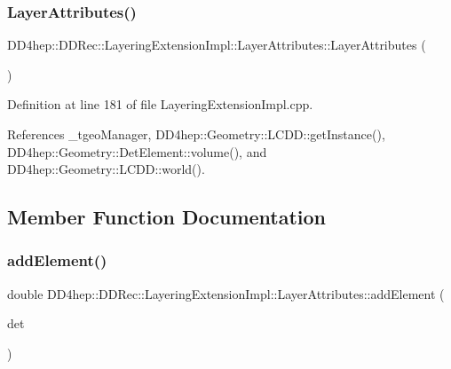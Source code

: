 \subsubsection{\texorpdfstring{Layer\+Attributes()}{LayerAttributes()}}
{\footnotesize\ttfamily D\+D4hep\+::\+D\+D\+Rec\+::\+Layering\+Extension\+Impl\+::\+Layer\+Attributes\+::\+Layer\+Attributes (\begin{DoxyParamCaption}{ }\end{DoxyParamCaption})}



Definition at line 181 of file Layering\+Extension\+Impl.\+cpp.



References \+\_\+tgeo\+Manager, D\+D4hep\+::\+Geometry\+::\+L\+C\+D\+D\+::get\+Instance(), D\+D4hep\+::\+Geometry\+::\+Det\+Element\+::volume(), and D\+D4hep\+::\+Geometry\+::\+L\+C\+D\+D\+::world().



\subsection{Member Function Documentation}
\hypertarget{struct_d_d4hep_1_1_d_d_rec_1_1_layering_extension_impl_1_1_layer_attributes_a39fc239560d87538d35e8e5051b9b0aa}{}\label{struct_d_d4hep_1_1_d_d_rec_1_1_layering_extension_impl_1_1_layer_attributes_a39fc239560d87538d35e8e5051b9b0aa} 
\subsubsection{\texorpdfstring{add\+Element()}{addElement()}}
{\footnotesize\ttfamily double D\+D4hep\+::\+D\+D\+Rec\+::\+Layering\+Extension\+Impl\+::\+Layer\+Attributes\+::add\+Element (\begin{DoxyParamCaption}\item[{const \hyperlink{class_d_d4hep_1_1_geometry_1_1_det_element}{Geometry\+::\+Det\+Element} \&}]{det }\end{DoxyParamCaption})\hspace{0.3cm}{\ttfamily [private]}}



